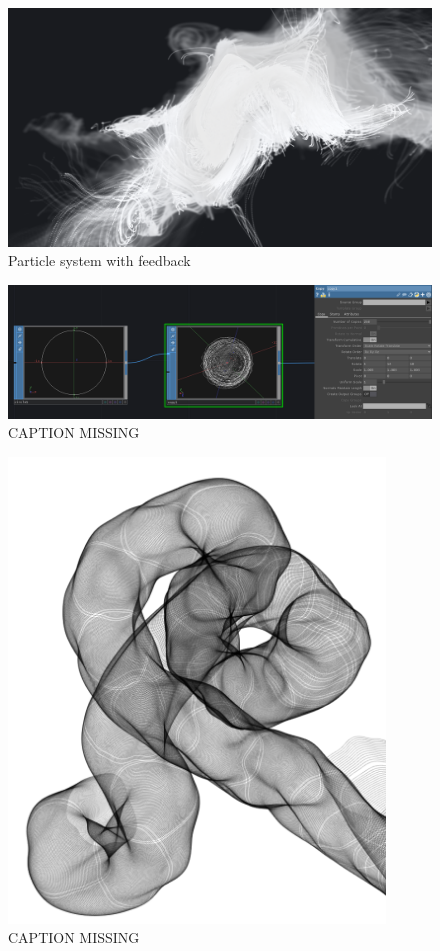 \begin{figure}[H]
	\centering
	\includegraphics[width=\textwidth]{img/particle2.png}
	\caption[Particle system with feedback]
	{Particle system with feedback}
	\label{fig:label}
\end{figure}


\begin{figure}[H]
  \centering
  \includegraphics[width=\textwidth]{img/copySop.PNG}
  \caption[shortCaption]
  {CAPTION MISSING}
  \label{fig:label}
\end{figure}




\begin{figure}[H]
  \centering
  \includegraphics[width=10cm]{img/ggForms01.PNG}
  \caption[shortCaption]
  {CAPTION MISSING}
  \label{fig:label}
\end{figure}


